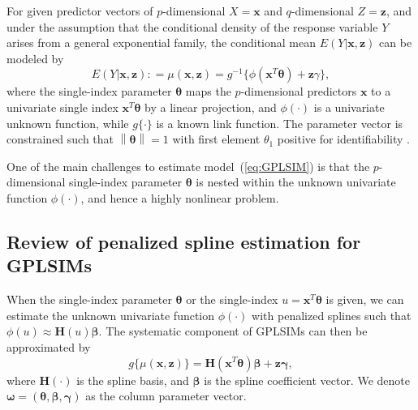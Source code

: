 For given predictor vectors of $p$-dimensional $X=\mathbf{x}$ and $q$-dimensional $Z=\mathbf{z}$, and under the assumption that the conditional density of the response variable $Y$ arises from a general exponential family, the conditional mean $E(Y|\mathbf{x}, \mathbf{z})$ can be modeled by 
\begin{equation}
  E(Y|\mathbf{x}, \mathbf{z}): = \mu(\mathbf{x}, \mathbf{z}) = g^{-1}\{\phi\left(\mathbf{x}^{T} \boldsymbol{\theta}\right)+\mathbf{z} \gamma\},
 \label{eq:GPLSIM} 
\end{equation}
where the single-index parameter $\boldsymbol{\theta}$ maps the $p$-dimensional predictors $\mathbf{x}$ to a univariate single index $\mathbf{x}^{T} \boldsymbol{\theta}$ by a linear projection, and $\phi(\cdot)$ is a univariate unknown function, while $g\{\cdot\}$ is a known link function. The parameter vector is constrained such that $\left\|\boldsymbol{\theta}\right\|=1$ with first element $\theta_1$ positive for identifiability \citep{yu_penalized_2002}. 

One of the main challenges to estimate model~(\ref{eq:GPLSIM}) is that the $p$-dimensional single-index parameter $\boldsymbol{\theta}$ is nested within the unknown univariate function $\phi(\cdot)$, and hence a highly nonlinear problem.

\subsection{Review of penalized spline estimation for GPLSIMs}

When the single-index parameter $\boldsymbol{\theta}$ or the single-index $u=\mathbf{x}^{T} \boldsymbol{\theta}$ is given,  we can estimate the unknown univariate function $\phi(\cdot)$ with penalized splines \citep{ruppert2003semiparametric} such that $\phi(u) \approx \mathbf{H}(u)\boldsymbol{\beta}$. The systematic component of GPLSIMs can then be approximated by
\begin{equation}g\{\mu(\mathbf{x}, \mathbf{z})\}=\mathbf{H}(\mathbf{x}^{T} \boldsymbol{\theta}) \boldsymbol{\beta}+\mathbf{z} \boldsymbol{\gamma},
\end{equation}
where $\mathbf{H}(\cdot)$ is the spline basis, and $\boldsymbol{\beta}$ is the spline coefficient vector. We denote $\boldsymbol{\omega}=\left(\boldsymbol{\theta}, \boldsymbol{\beta}, \boldsymbol{\gamma}\right)$ as the column parameter vector.

